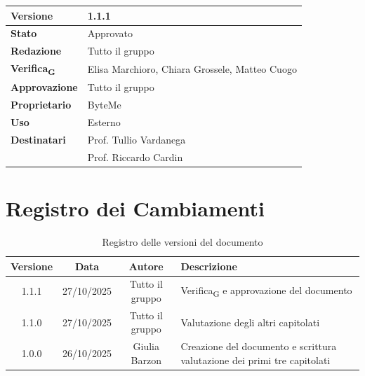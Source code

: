 \documentclass[11pt,a4paper]{article}
\newcommand{\gls}[1]{#1\textsubscript{G}}
\begin{document}
\begin{titlepage}
    \begin{table}[H]
        \centering
        \begin{tabular}{|l|p{5cm}|}
            \hline
            \textbf{Versione} & 1.1.1 \\
            \hline
            \textbf{Stato} & Approvato \\
            \hline
            \textbf{Redazione} & Tutto il gruppo \\
            \hline
            \textbf{\gls{Verifica}} & Elisa Marchioro, Chiara Grossele, Matteo Cuogo \\
            \hline
            \textbf{Approvazione} & Tutto il gruppo \\
            \hline
            \textbf{Proprietario} & ByteMe \\
            \hline
            \textbf{Uso} & Esterno \\
            \hline
            \textbf{Destinatari} & Prof. Tullio Vardanega \\ & Prof. Riccardo Cardin \\
            \hline
        \end{tabular}
    \end{table}
    
    \vfill
\end{titlepage}

\section*{Registro dei Cambiamenti}

\begin{table}[H]
    \centering
    \begin{tabular}{|c|c|c|>{\raggedright\arraybackslash}p{}|}
        \hline
        \textbf{Versione} & \textbf{Data} & \textbf{Autore} & \textbf{Descrizione} \\
        \hline
        1.1.1 & 27/10/2025 & Tutto il gruppo & \gls{Verifica} e approvazione del documento \\
        \hline
        1.1.0 & 27/10/2025 & Tutto il gruppo & Valutazione degli altri capitolati \\
        \hline
        1.0.0 & 26/10/2025 & Giulia Barzon & Creazione del documento e scrittura valutazione dei primi tre capitolati \\
        \hline
    \end{tabular}
    \caption{Registro delle versioni del documento}
    \label{tab:versionamento}
\end{table}
\end{document}
